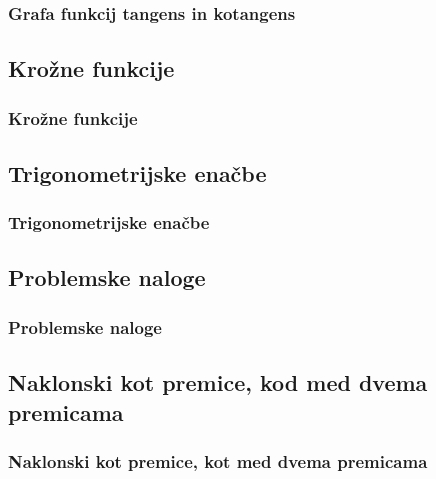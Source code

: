         \begin{frame}
            \frametitle{Grafa funkcij tangens in kotangens}
        \end{frame}

    \subsection{Krožne funkcije}

        \begin{frame}
            \frametitle{Krožne funkcije}
        \end{frame}

    \subsection{Trigonometrijske enačbe}

        \begin{frame}
            \frametitle{Trigonometrijske enačbe}
        \end{frame}

    \subsection{Problemske naloge}

        \begin{frame}
            \frametitle{Problemske naloge}
        \end{frame}

    \subsection{Naklonski kot premice, kod med dvema premicama}
        
        \begin{frame}
            \frametitle{Naklonski kot premice, kot med dvema premicama}
        \end{frame}